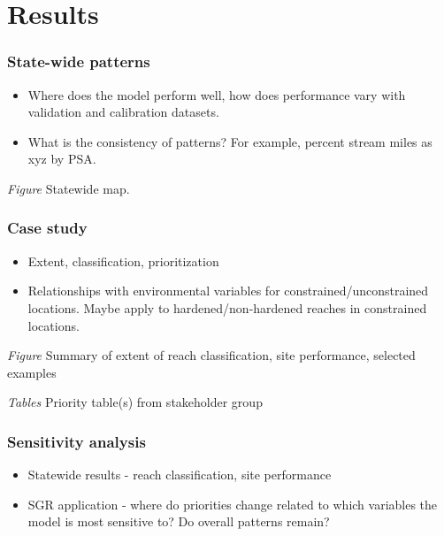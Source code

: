 \documentclass[]{article}
\begin{document}
\section{Results}\label{results}

\subsubsection{State-wide patterns}\label{state-wide-patterns}

\begin{itemize}
\item
  Where does the model perform well, how does performance vary with
  validation and calibration datasets.
\item
  What is the consistency of patterns? For example, percent stream miles
  as xyz by PSA.
\end{itemize}

\emph{Figure} Statewide map.

\subsubsection{Case study}\label{case-study}

\begin{itemize}
\item
  Extent, classification, prioritization
\item
  Relationships with environmental variables for
  constrained/unconstrained locations. Maybe apply to
  hardened/non-hardened reaches in constrained locations.
\end{itemize}

\emph{Figure} Summary of extent of reach classification, site
performance, selected examples

\emph{Tables} Priority table(s) from stakeholder group

\subsubsection{Sensitivity analysis}\label{sensitivity-analysis}

\begin{itemize}
\item
  Statewide results - reach classification, site performance
\item
  SGR application - where do priorities change related to which
  variables the model is most sensitive to? Do overall patterns remain?
\end{itemize}
\end{document}
